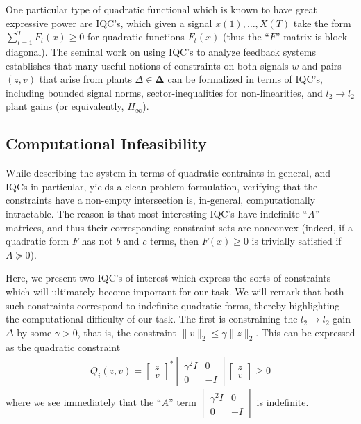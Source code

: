 \documentclass[11pt]{article} %
\theoremstyle{plain}
\theoremstyle{definition}
\theoremstyle{remark}
\begin{document}
One particular type of quadratic functional which is known to have great expressive power are IQC's, which given a signal $x(1),\dots,X(T)$ take the form $\sum_{t =1}^T F_t(x) \ge 0$ for quadratic functions $F_t(x)$ (thus the ``$F$'' matrix is block-diagonal). The seminal work on using IQC's to analyze feedback systems \cite{megretski1997system} establishes that many useful notions of constraints on both signals $w$ and pairs $(z,v)$ that arise from plants $\Delta \in \boldsymbol{\Delta}$ can be formalized in terms of IQC's, including bounded signal norms, sector-inequalities for non-linearities, and $l_2 \to l_2$ plant gains (or equivalently, $H_{\infty}$).
\subsection{Computational Infeasibility}
While describing the system in terms of quadratic contraints in general, and IQCs in particular, yields a clean problem formulation, verifying that the constraints have a non-empty intersection is, in-general, computationally intractable. The reason is that most interesting IQC's have indefinite ``$A$''-matrices, and thus their corresponding constraint sets are nonconvex (indeed, if a quadratic form $F$ has not $b$ and $c$ terms, then $F(x) \ge 0$ is trivially satisfied if $A \succeq 0$).

 Here, we present two IQC's of interest which express the sorts of constraints which will ultimately become important for our task. We will remark that both such constraints correspond to indefinite quadratic forms, thereby highlighting the computational difficulty of our task. The first is constraining the $l_2 \to l_2$ gain $\Delta$ by some $\gamma > 0$, that is, the constraint $\|v\|_2 \le \gamma \|z\|_2$. This can be expressed as the quadratic constraint
 \begin{eqnarray}
 Q_i(z,v) = \begin{bmatrix} z \\
 v \end{bmatrix}^* \begin{bmatrix} \gamma^2 I & 0 \\
 0 & - I \end{bmatrix}\begin{bmatrix} z \\
 v \end{bmatrix} \ge 0
 \end{eqnarray} 
 where we see immediately that the ``$A$'' term $\begin{bmatrix} \gamma^2 I & 0 \\
 0 & - I \end{bmatrix}$ is indefinite.
\end{document}
